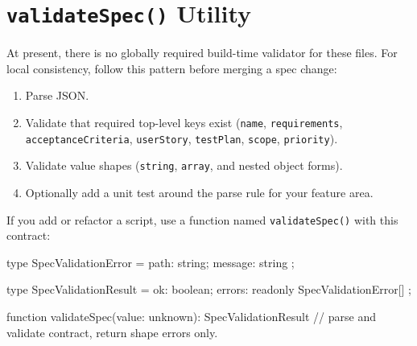 \section{\texorpdfstring{\texttt{v\allowbreak{}a\allowbreak{}l\allowbreak{}i\allowbreak{}d\allowbreak{}a\allowbreak{}t\allowbreak{}e\allowbreak{}S\allowbreak{}p\allowbreak{}e\allowbreak{}c\allowbreak{}(\allowbreak{})} Utility}{ Utility}}\label{record-012-validatespec-utility}

At present, there is no globally required build-time validator for these files. For local consistency, follow this pattern before merging a spec change:

\begin{enumerate}
\def\labelenumi{\arabic{enumi}.}
\tightlist
\item
  Parse JSON.
\item
  Validate that required top-level keys exist (\texttt{n\allowbreak{}a\allowbreak{}m\allowbreak{}e}, \texttt{r\allowbreak{}e\allowbreak{}q\allowbreak{}u\allowbreak{}i\allowbreak{}r\allowbreak{}e\allowbreak{}m\allowbreak{}e\allowbreak{}n\allowbreak{}t\allowbreak{}s}, \texttt{a\allowbreak{}c\allowbreak{}c\allowbreak{}e\allowbreak{}p\allowbreak{}t\allowbreak{}a\allowbreak{}n\allowbreak{}c\allowbreak{}e\allowbreak{}C\allowbreak{}r\allowbreak{}i\allowbreak{}t\allowbreak{}e\allowbreak{}r\allowbreak{}i\allowbreak{}a}, \texttt{u\allowbreak{}s\allowbreak{}e\allowbreak{}r\allowbreak{}S\allowbreak{}t\allowbreak{}o\allowbreak{}r\allowbreak{}y}, \texttt{t\allowbreak{}e\allowbreak{}s\allowbreak{}t\allowbreak{}P\allowbreak{}l\allowbreak{}a\allowbreak{}n}, \texttt{s\allowbreak{}c\allowbreak{}o\allowbreak{}p\allowbreak{}e}, \texttt{p\allowbreak{}r\allowbreak{}i\allowbreak{}o\allowbreak{}r\allowbreak{}i\allowbreak{}t\allowbreak{}y}).
\item
  Validate value shapes (\texttt{s\allowbreak{}t\allowbreak{}r\allowbreak{}i\allowbreak{}n\allowbreak{}g}, \texttt{a\allowbreak{}r\allowbreak{}r\allowbreak{}a\allowbreak{}y}, and nested object forms).
\item
  Optionally add a unit test around the parse rule for your feature area.
\end{enumerate}

If you add or refactor a script, use a function named \texttt{v\allowbreak{}a\allowbreak{}l\allowbreak{}i\allowbreak{}d\allowbreak{}a\allowbreak{}t\allowbreak{}e\allowbreak{}S\allowbreak{}p\allowbreak{}e\allowbreak{}c\allowbreak{}(\allowbreak{})} with this contract:

\begin{CodeBlock}
type SpecValidationError = { path: string; message: string };

type SpecValidationResult = { ok: boolean; errors: readonly SpecValidationError[] };

function validateSpec(value: unknown): SpecValidationResult {
  // parse and validate contract, return shape errors only.
}
\end{CodeBlock}

